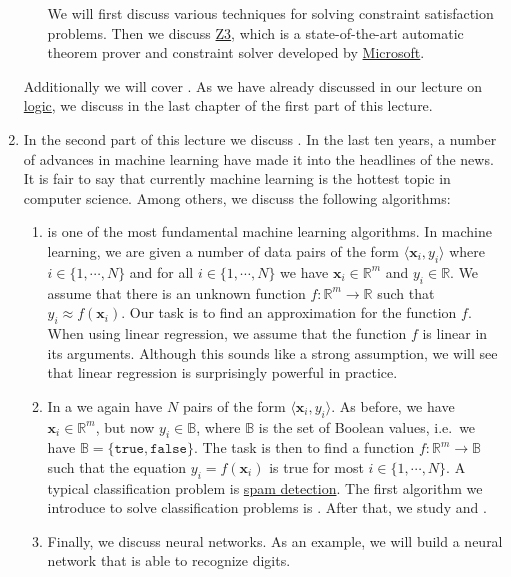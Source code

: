 \begin{enumerate}
\begin{enumerate}
            We will first discuss various techniques for solving constraint satisfaction problems.
            Then we discuss \href{https://github.com/Z3Prover/z3}{Z3}, which is a state-of-the-art automatic theorem
            prover and constraint solver developed by
            \href{https://www.microsoft.com/en-us/research/project/z3-3/}{Microsoft}.
      \end{enumerate}
      Additionally we will cover .  As we have already discussed 
       in our lecture on
      \href{https://github.com/karlstroetmann/Logic}{logic}, we discuss  in
      the last chapter of the first part of this lecture. 
\item In the second part of this lecture we discuss .  In the last ten years, a number of
      advances in machine learning have made it into the headlines of the news.  It is fair to say that
      currently machine learning is the hottest topic in computer science.  Among others, we discuss the following
      algorithms:
      \begin{enumerate}
      \item {} is one of the most fundamental machine learning algorithms.
            In machine learning, we are given a number of data pairs of the form  $\langle \mathbf{x}_i, y_i \rangle$ 
            where $i \in \{1,\cdots,N\}$ and for all $i \in \{1,\cdots,N\}$ we have $\mathbf{x}_i \in \mathbb{R}^m$
            and $y_i \in \mathbb{R}$.  We assume that there is an unknown function $f:\mathbb{R}^m \rightarrow \mathbb{R}$
            such that $y_i \approx f(\mathbf{x}_i)$.  Our task is to find an approximation for the function
            $f$.  When using linear regression, we assume that the function $f$ is linear in its arguments.
            Although this sounds like a strong assumption, we will see that linear regression is surprisingly
            powerful in practice.
      \item In a  we again have $N$ pairs of the form $\langle \mathbf{x}_i, y_i
        \rangle$.
            As before,  we have $\mathbf{x}_i \in \mathbb{R}^m$, but now $y_i \in \mathbb{B}$, where
            $\mathbb{B}$ is the set of Boolean values, i.e.~we have $\mathbb{B} = \{\mathtt{true}, \mathtt{false}\}$.
            The task is then to find a function $f:\mathbb{R}^m \rightarrow \mathbb{B}$
            such that the equation $y_i = f(\mathbf{x}_i)$ is true for most $i\in\{1,\cdots,N\}$.  A typical
            classification problem is \href{https://en.wikipedia.org/wiki/Email_spam}{spam detection}.  The
            first algorithm we introduce to solve classification problems is .
            After that, we study  and .
      \item Finally, we discuss neural networks.  As an example, we will build a neural network that is able to
            recognize digits. 
      \end{enumerate}
\end{enumerate}
\pagebreak

